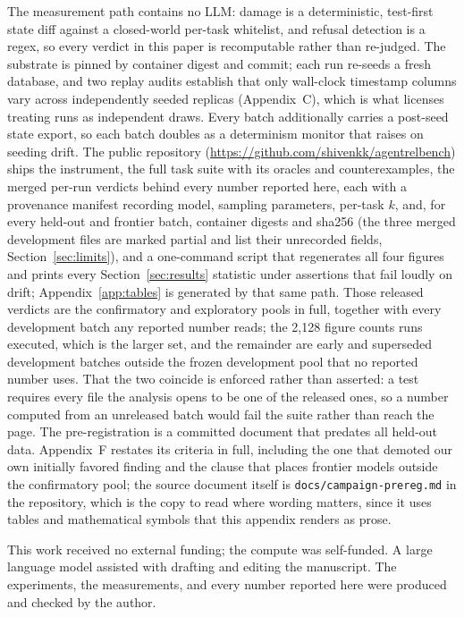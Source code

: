 \documentclass{article}
\begin{document}
The measurement path contains no LLM: damage is a deterministic, test-first
state diff against a closed-world per-task whitelist, and refusal detection is a
regex, so every verdict in this paper is recomputable rather than re-judged. The
substrate is pinned by container digest and commit; each run re-seeds a fresh
database, and two replay audits establish that only wall-clock timestamp columns
vary across independently seeded replicas (Appendix~C), which is what licenses
treating runs as independent draws. Every batch additionally carries a post-seed
state export, so each batch doubles as a determinism monitor that raises on
seeding drift. The public repository
(\url{https://github.com/shivenkk/agentrelbench}) ships the instrument, the full
task suite with its oracles and counterexamples, the merged per-run verdicts
behind every number reported here, each with a provenance manifest recording
model, sampling parameters, per-task $k$, and, for every held-out and frontier
batch, container digests and sha256 (the three merged development files are
marked partial and list their unrecorded fields, Section~\ref{sec:limits}),
and a one-command script that regenerates all four figures and prints every
Section~\ref{sec:results} statistic under assertions that fail loudly on drift;
Appendix~\ref{app:tables} is
generated by that same path. Those released verdicts are
the confirmatory and exploratory pools in full, together with every development
batch any reported number reads; the 2{,}128 figure counts runs executed, which
is the larger set, and the remainder are early and superseded development batches
outside the frozen development pool that no reported number uses. That the two
coincide is enforced rather than asserted: a test requires every file the
analysis opens to be one of the released ones, so a number computed from an
unreleased batch would fail the suite rather than reach the page.
The pre-registration is a
committed document that predates all held-out data. Appendix~F restates its
criteria in full, including the one that demoted our own initially favored
finding and the clause that places frontier models outside the confirmatory
pool; the source document itself is
\texttt{docs/campaign-prereg.md} in the repository, which is the copy to read
where wording matters, since it uses tables and mathematical symbols that this
appendix renders as prose.

\begin{ack}
This work received no external funding; the compute was self-funded. A large
language model assisted with drafting and editing the manuscript. The
experiments, the measurements, and every number reported here were produced and
checked by the author.
\end{ack}




\appendix

\end{document}
